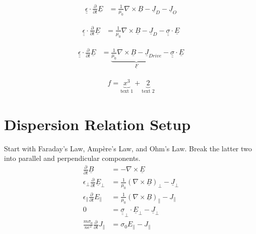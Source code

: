 \documentclass{article}
\newcommand{\Ampere}{Amp\`ere\xspace}
\begin{document}
\begin{align*}
  \underline{ \underline{\epsilon} } \cdot \frac{\partial}{\partial t} \underline{E} &=
    \frac{1}{\mu_0} \nabla \times \underline{B} - 
    \underline{J}_D - 
    \underline{J}_O
\end{align*}


\begin{align*}
  \underline{ \underline{\epsilon} } \cdot \frac{\partial}{\partial t} \underline{E} &=
    \frac{1}{\mu_0} \nabla \times \underline{B} - 
    \underline{J}_{D} - 
    \underline{ \underline{\sigma} } \cdot \underline{E}
\end{align*}


\begin{align*}
  \underline{ \underline{\epsilon} } \cdot \frac{\partial}{\partial t} \underline{E} &=
    \underbrace{ \frac{1}{\mu_0} \nabla \times \underline{B} - 
    \underline{J}_{Drive} }_{ \underline{F} } - 
    \underline{ \underline{\sigma} } \cdot \underline{E}
\end{align*}





\begin{align*}
  f = \underbrace{x^3}_\textrm{text 1} + \underbrace{2}_\textrm{text 2}
\end{align*}














\section{Dispersion Relation Setup}

Start with Faraday's Law, \Ampere's Law, and Ohm's Law. Break the latter two
into parallel and perpendicular components. 
\begin{align}
  \frac{\partial}{\partial t} \underline{B} &= -\nabla \times \underline{E} \\
  \epsilon_\bot \frac{\partial}{\partial t} \underline{E}_\bot &= 
    \frac{1}{\mu_0} \left( \nabla \times \underline{B} \right)_\bot -
    \underline{J}_\bot \\
  \epsilon_\parallel \frac{\partial}{\partial t} E_\parallel & = 
    \frac{1}{\mu_0} \left( \nabla \times \underline{B} \right)_\parallel -
    J_\parallel \\
  \label{ohm_perp}
  0 & = \underline{\underline{\sigma}}_\bot \cdot \underline{E}_\bot - 
    \underline{J}_\bot \\
  \label{ohm_par}
  \frac{m \sigma_0}{n e^2} \frac{\partial}{\partial t} J_\parallel & = 
    \sigma_0 E_\parallel - J_\parallel
\end{align}
\end{document}
